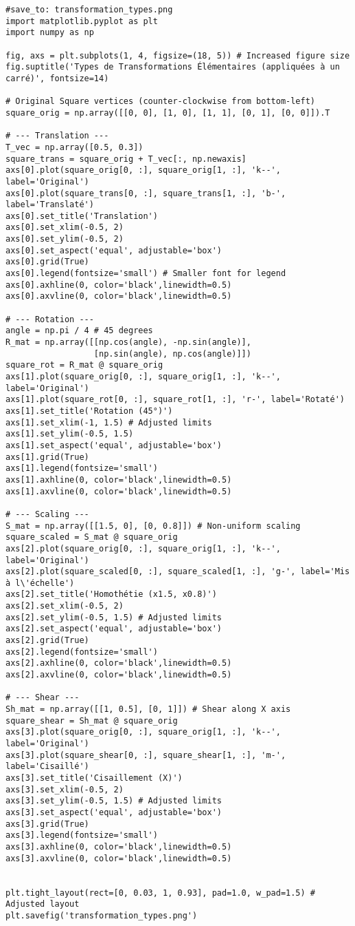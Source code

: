 \documentclass{article}
\begin{document}
\begin{verbatim}
#save_to: transformation_types.png
import matplotlib.pyplot as plt
import numpy as np

fig, axs = plt.subplots(1, 4, figsize=(18, 5)) # Increased figure size
fig.suptitle('Types de Transformations Élémentaires (appliquées à un carré)', fontsize=14)

# Original Square vertices (counter-clockwise from bottom-left)
square_orig = np.array([[0, 0], [1, 0], [1, 1], [0, 1], [0, 0]]).T

# --- Translation ---
T_vec = np.array([0.5, 0.3])
square_trans = square_orig + T_vec[:, np.newaxis]
axs[0].plot(square_orig[0, :], square_orig[1, :], 'k--', label='Original')
axs[0].plot(square_trans[0, :], square_trans[1, :], 'b-', label='Translaté')
axs[0].set_title('Translation')
axs[0].set_xlim(-0.5, 2)
axs[0].set_ylim(-0.5, 2)
axs[0].set_aspect('equal', adjustable='box')
axs[0].grid(True)
axs[0].legend(fontsize='small') # Smaller font for legend
axs[0].axhline(0, color='black',linewidth=0.5)
axs[0].axvline(0, color='black',linewidth=0.5)

# --- Rotation ---
angle = np.pi / 4 # 45 degrees
R_mat = np.array([[np.cos(angle), -np.sin(angle)],
                  [np.sin(angle), np.cos(angle)]])
square_rot = R_mat @ square_orig
axs[1].plot(square_orig[0, :], square_orig[1, :], 'k--', label='Original')
axs[1].plot(square_rot[0, :], square_rot[1, :], 'r-', label='Rotaté')
axs[1].set_title('Rotation (45°)')
axs[1].set_xlim(-1, 1.5) # Adjusted limits
axs[1].set_ylim(-0.5, 1.5)
axs[1].set_aspect('equal', adjustable='box')
axs[1].grid(True)
axs[1].legend(fontsize='small')
axs[1].axhline(0, color='black',linewidth=0.5)
axs[1].axvline(0, color='black',linewidth=0.5)

# --- Scaling ---
S_mat = np.array([[1.5, 0], [0, 0.8]]) # Non-uniform scaling
square_scaled = S_mat @ square_orig
axs[2].plot(square_orig[0, :], square_orig[1, :], 'k--', label='Original')
axs[2].plot(square_scaled[0, :], square_scaled[1, :], 'g-', label='Mis à l\'échelle')
axs[2].set_title('Homothétie (x1.5, x0.8)')
axs[2].set_xlim(-0.5, 2)
axs[2].set_ylim(-0.5, 1.5) # Adjusted limits
axs[2].set_aspect('equal', adjustable='box')
axs[2].grid(True)
axs[2].legend(fontsize='small')
axs[2].axhline(0, color='black',linewidth=0.5)
axs[2].axvline(0, color='black',linewidth=0.5)

# --- Shear ---
Sh_mat = np.array([[1, 0.5], [0, 1]]) # Shear along X axis
square_shear = Sh_mat @ square_orig
axs[3].plot(square_orig[0, :], square_orig[1, :], 'k--', label='Original')
axs[3].plot(square_shear[0, :], square_shear[1, :], 'm-', label='Cisaillé')
axs[3].set_title('Cisaillement (X)')
axs[3].set_xlim(-0.5, 2)
axs[3].set_ylim(-0.5, 1.5) # Adjusted limits
axs[3].set_aspect('equal', adjustable='box')
axs[3].grid(True)
axs[3].legend(fontsize='small')
axs[3].axhline(0, color='black',linewidth=0.5)
axs[3].axvline(0, color='black',linewidth=0.5)


plt.tight_layout(rect=[0, 0.03, 1, 0.93], pad=1.0, w_pad=1.5) # Adjusted layout
plt.savefig('transformation_types.png')
\end{verbatim}
\end{document}
